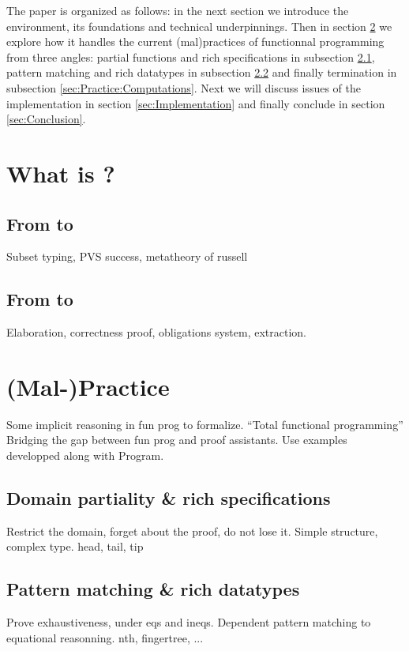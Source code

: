 \documentclass[preprint,10pt]{sigplanconf}
\begin{document}
The paper is organized as follows: in the next section we introduce the
\Program environment, its foundations and technical underpinnings. Then
in section \ref{sec:Practice} we explore how it handles the current (mal)practices of functionnal
programming from three angles: partial functions and rich specifications
in subsection \ref{sec:Practice:PartialDomains}, pattern matching
and rich datatypes in subsection \ref{sec:Practice:Data} and finally
termination in subsection \ref{sec:Practice:Computations}. Next we will discuss issues of the 
implementation in section \ref{sec:Implementation} and finally
conclude in section \ref{sec:Conclusion}.

\section{What is \Program ?}
\label{sec:Program}
\subsection{From \PVS to \Russell}
\label{sec:Program:PVS-Russell}
Subset typing, PVS success, metatheory of russell

\subsection{From \Russell to \Coq}
\label{sec:Program:Russell-Coq}
Elaboration, correctness proof, obligations system, extraction.

\section{(Mal-)Practice}
\label{sec:Practice}
Some implicit reasoning in fun prog to formalize.
``Total functional programming''
Bridging the gap between fun prog and proof assistants.
Use examples developped along with Program.

\subsection{Domain partiality \& rich specifications}
\label{sec:Practice:PartialDomains}
Restrict the domain, forget about the proof, do not lose it.
Simple structure, complex type.
head, tail, tip

\subsection{Pattern matching  \& rich datatypes}
\label{sec:Practice:Data}
Prove exhaustiveness, under eqs and ineqs.
Dependent pattern matching to equational reasonning.
nth, fingertree, ...
\end{document}
